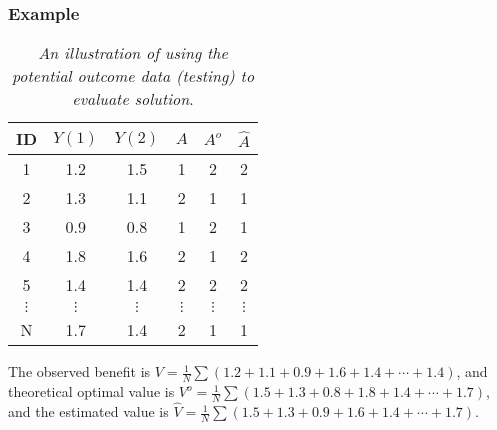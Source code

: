 \documentclass{beamer}
\def\hat{\widehat}
\begin{document}
\begin{frame}
	\frametitle{Example}
	\begin{table}[htbp]
		\centering
		\caption{\emph{An illustration of using the potential outcome data (testing) to evaluate solution}. }
		\begin{tabular}{c|cc|ccc}
			\hline
			\hline
			ID &  $Y(1)$    & $Y(2)$    & $A$ & $A^o$ & $\hat{A} $  \\
			\hline
			1& 1.2    & 1.5    &   1& 2 &2 \\
			2& 1.3    & 1.1    &  2 & 1 &1\\
			3& 0.9    & 0.8    &    1 & 2 &1 \\
			4& 1.8    & 1.6    &   2 & 1 &2 \\
			5& 1.4    & 1.4    &  2 & 2 &2 \\
			$\vdots$ &  $\vdots$   & $\vdots$     & $\vdots$     & $\vdots$ &  $\vdots$    \\
			N & 1.7    & 1.4    &   2 & 1 &1\\
			\hline
			\hline
		\end{tabular}%
		\label{tab:TestingDataExample2}%
	\end{table}
The observed benefit is $V=\frac{1}{N} \sum (1.2+1.1+0.9+1.6+1.4+\cdots+1.4)$, and theoretical optimal value is $V^o=\frac{1}{N}  \sum (1.5+1.3+0.8+1.8+1.4+\cdots+1.7)$, and the estimated value is $\hat{V}=\frac{1}{N}  \sum (1.5+1.3+0.9+1.6+1.4+\cdots+1.7)$.
\end{frame}
\end{document}
